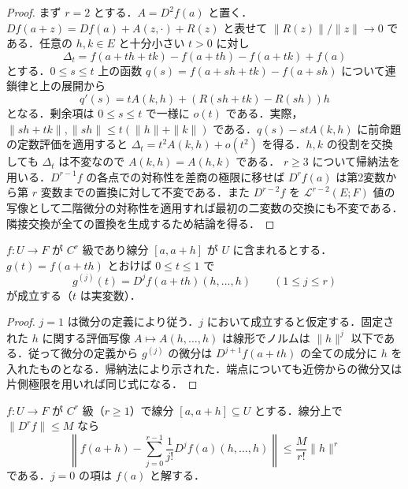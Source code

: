 \begin{proof}
まず $r=2$ とする．$A=D^2f(a)$ と置く．$Df(a+z)=Df(a)+A(z,\cdot)+R(z)$ と表せて $\|R(z)\|/\|z\|\to0$ である．任意の $h,k\in E$ と十分小さい $t>0$ に対し
\[
\Delta_t=f(a+th+tk)-f(a+th)-f(a+tk)+f(a)
\]
とする．$0\leq s\leq t$ 上の函数 $q(s)=f(a+sh+tk)-f(a+sh)$ について連鎖律と上の展開から
\[
q'(s)=tA(k,h)+(R(sh+tk)-R(sh))h
\]
となる．剰余項は $0\leq s\leq t$ で一様に $o(t)$ である．実際，$\|sh+tk\|,\|sh\|\leq t(\|h\|+\|k\|)$ である．$q(s)-stA(k,h)$ に前命題の定数評価を適用すると $\Delta_t=t^2A(k,h)+o(t^2)$ を得る．$h,k$ の役割を交換しても $\Delta_t$ は不変なので $A(k,h)=A(h,k)$ である．
$r\geq3$ について帰納法を用いる．$D^{r-1}f$ の各点での対称性を差商の極限に移せば $D^rf(a)$ は第2変数から第 $r$ 変数までの置換に対して不変である．また $D^{r-2}f$ を $\mathcal L^{r-2}(E;F)$ 値の写像として二階微分の対称性を適用すれば最初の二変数の交換にも不変である．隣接交換が全ての置換を生成するため結論を得る．
\end{proof}
\begin{prop}[線分に沿う高階微分]
$f:U\to F$ が $C^r$ 級であり線分 $[a,a+h]$ が $U$ に含まれるとする．$g(t)=f(a+th)$ とおけば $0\leq t\leq1$ で
\[
g^{(j)}(t)=D^jf(a+th)(h,\ldots,h)\qquad(1\leq j\leq r)
\]
が成立する（$t$ は実変数）．
\end{prop}
\begin{proof}
$j=1$ は微分の定義により従う．$j$ において成立すると仮定する．固定された $h$ に関する評価写像 $A\mapsto A(h,\ldots,h)$ は線形でノルムは $\|h\|^j$ 以下である．従って微分の定義から $g^{(j)}$ の微分は $D^{j+1}f(a+th)$ の全ての成分に $h$ を入れたものとなる．帰納法により示された．端点についても近傍からの微分又は片側極限を用いれば同じ式になる．
\end{proof}
\begin{prop}[高階微分によるTaylor剰余評価]
$f:U\to F$ が $C^r$ 級（$r\geq1$）で線分 $[a,a+h]\subseteq U$ とする．線分上で $\|D^rf\|\leq M$ なら
\[
\left\|f(a+h)-\sum_{j=0}^{r-1}\frac1{j!}D^jf(a)(h,\ldots,h)\right\|\leq\frac{M}{r!}\|h\|^r
\]
である．$j=0$ の項は $f(a)$ と解する．
\end{prop}
